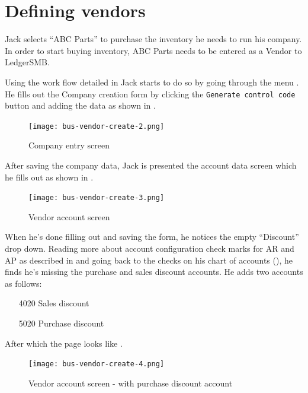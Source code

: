 \section{Defining vendors}
\label{sec-stock-defining-vendors}

Jack selects ``ABC Parts'' to purchase the inventory he needs to run his company. In
order to start buying inventory, ABC Parts needs to be entered as a Vendor to LedgerSMB.

Using the work flow detailed in  Jack starts to do so by going through the menu .
He fills out the Company creation form by clicking the {\tt Generate control code}
button and adding the data as shown in .

\begin{figure}[h]
\centering
\texttt{[image: bus-vendor-create-2.png]}
\caption{Company entry screen}
\label{fig:vendor-create-1}
\end{figure}

After saving the company data, Jack is presented the account data screen which he fills out
as shown in .

\begin{figure}[h]
\centering
\texttt{[image: bus-vendor-create-3.png]}
\caption{Vendor account screen}
\label{fig:vendor-create-2}
\end{figure}

When he's done filling out and saving the form,
he notices the empty ``Discount'' drop down. Reading more about account configuration
check marks for AR and AP as described in  and going back to the checks on his
chart of accounts (), he finds he's missing the purchase and
sales discount accounts. He adds two accounts as follows:

\begin{itemize}
\item [4020] Sales discount
\item [5020] Purchase discount
\end{itemize}

After which the page looks like .

\begin{figure}[h]
\centering
\texttt{[image: bus-vendor-create-4.png]}
\caption{Vendor account screen - with purchase discount account}
\label{fig:vendor-create-3}
\end{figure}

